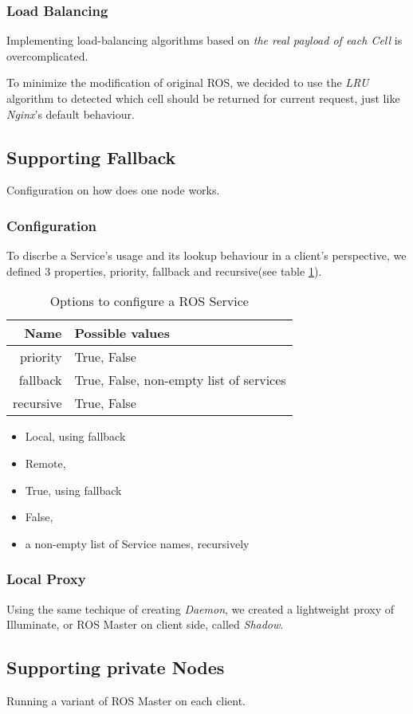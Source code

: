 \subsubsection{Load Balancing}
Implementing load-balancing algorithms based on \emph{the real payload of each Cell} is overcomplicated.

To minimize the modification of original ROS, we decided to use the \emph{LRU} algorithm to detected which cell should be returned for current request, just like \emph{Nginx}'s default behaviour.

\subsection{Supporting Fallback}
Configuration on how does one node works. 

\subsubsection{Configuration}
To discrbe a Service's usage and its lookup behaviour in a client's perspective, we defined 3 properties, priority, fallback and recursive(see table \ref{table:srv-opt}).

\begin{table}
    \renewcommand{\arraystretch}{1.3}
    \caption{Options to configure a ROS Service}
    \label{table:srv-opt}
    \centering
    \begin{tabular}{rl}
        \hline
        \bfseries Name & \bfseries Possible values\\
        \hline
        priority  & True, False \\
        fallback  & True, False, non-empty list of services \\
        recursive & True, False \\
        \hline
    \end{tabular}
\end{table} 

\begin{itemize}
    \item Local, using fallback 
    \item Remote, 
\end{itemize}

\begin{itemize}
    \item True, using fallback 
    \item False, 
    \item a non-empty list of Service names, recursively 
\end{itemize}

\subsubsection{Local Proxy}
Using the same techique of creating \emph{Daemon}, we created a lightweight proxy of Illuminate, or ROS Master on client side, called \emph{Shadow}.


\subsection{Supporting private Nodes}
Running a variant of ROS Master on each client.


